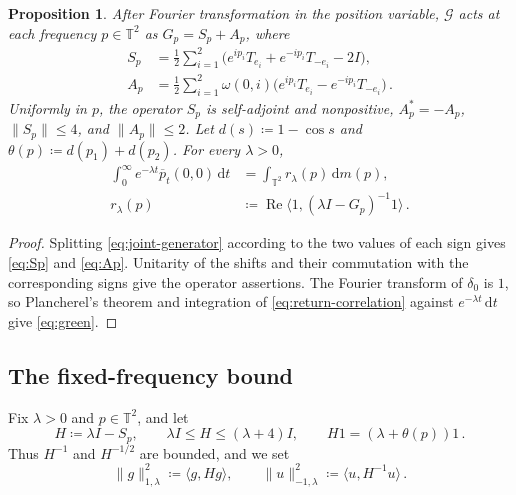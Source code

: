 \documentclass[11pt]{amsart}
\theoremstyle{plain}
\newtheorem{proposition}[theorem]{Proposition}
\theoremstyle{definition}
\newcommand{\T}{\mathbb T}
\newcommand{\1}{\mathbf 1}
\newcommand{\ip}[2]{\langle #1,#2\rangle}
\newcommand{\norm}[1]{\lVert #1\rVert}
\newcommand{\dd}{\,\mathrm d}
\newcommand{\Hminus}[1]{\norm{#1}_{-1,\lambda}}
\newcommand{\Hplus}[1]{\norm{#1}_{1,\lambda}}
\begin{document}
	\begin{proposition}\label{prop:generator}
		After Fourier transformation in the position variable, $\mathcal G$ acts
		at each frequency $p\in\T^2$ as $G_p=S_p+A_p$, where
		\begin{align}
			S_p&=\frac12\sum_{i=1}^2
			\bigl(e^{ip_i}T_{e_i}+e^{-ip_i}T_{-e_i}-2I\bigr),\label{eq:Sp}\\
			A_p&=\frac12\sum_{i=1}^2\omega(0,i)
			\bigl(e^{ip_i}T_{e_i}-e^{-ip_i}T_{-e_i}\bigr)\, .\label{eq:Ap}
		\end{align}
		Uniformly in $p$, the operator $S_p$ is self-adjoint and nonpositive,
		$A_p^*=-A_p$, $\norm{S_p}\leq4$, and $\norm{A_p}\leq2$.
		Let $d(s)\coloneqq1-\cos s$ and $\theta(p)\coloneqq d(p_1)+d(p_2)$.
		For every $\lambda>0$,
		\begin{align}
			\int_0^\infty e^{-\lambda t}\overline p_t(0,0)\dd t
			&=\int_{\T^2}r_\lambda(p)\dd m(p),\label{eq:green}\\
			r_\lambda(p)&\coloneqq
			\operatorname{Re}\ip1{(\lambda I-G_p)^{-1}1}\, .\label{eq:frequency-resolvent}
		\end{align}
	\end{proposition}
	
	\begin{proof}
		Splitting \eqref{eq:joint-generator} according to the two values of each
		sign gives \eqref{eq:Sp} and \eqref{eq:Ap}.  Unitarity of the shifts and
		their commutation with the corresponding signs give the operator
		assertions.  The Fourier transform of $\delta_0$ is $1$, so Plancherel's
		theorem and integration of \eqref{eq:return-correlation} against
		$e^{-\lambda t}\dd t$ give \eqref{eq:green}.
	\end{proof}
	
	\subsection{The fixed-frequency bound}\label{ssec:varbound}
	
	Fix $\lambda>0$ and $p\in\T^2$, and let
	\begin{equation}\label{eq:H}
		H\coloneqq\lambda I-S_p,\qquad
		\lambda I\leq H\leq(\lambda+4)I,\qquad
		H1=(\lambda+\theta(p))1\, .
	\end{equation}
	Thus $H^{-1}$ and $H^{-1/2}$ are bounded, and we set
	\begin{equation}\label{eq:Hnorms}
		\Hplus g^2\coloneqq\ip g{Hg},\qquad
		\Hminus u^2\coloneqq\ip u{H^{-1}u}\, .
	\end{equation}
	
\end{document}

